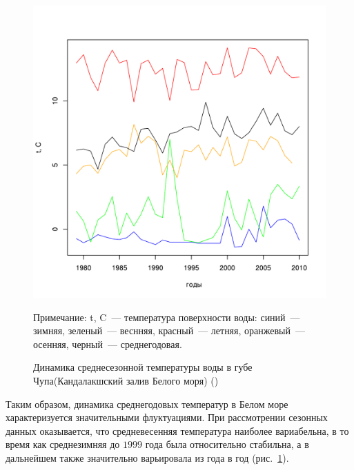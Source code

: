 	\begin{figure}[p]
    \includegraphics[width=\textwidth]{../White_Sea/temperature_Kartesh/t_mean_season_year1.pdf}
    \caption{Динамика среднесезонной температуры воды в губе Чупа(Кандалакшский залив Белого моря) (\cite{Berger_et_al_2003})}

{\footnotesize Примечание: t, C~--- температура поверхности воды: синий~--- зимняя, зеленый~--- веснняя, красный~--- летняя, оранжевый~--- осенняя, черный~--- среднегодовая. }
    \label{ris:White_temp_seasons_dynamic}
	\end{figure}


Таким образом, динамика среднегодовых температур в Белом море характеризуется значительными флуктуациями.
При рассмотрении сезонных данных оказывается, что средневесенняя температура наиболее вариабельна, в то время как среднезимняя до $1999$ года была относительно стабильна, а в дальнейшем также значительно варьировала из года в год (рис.~\ref{ris:White_temp_seasons_dynamic}).

